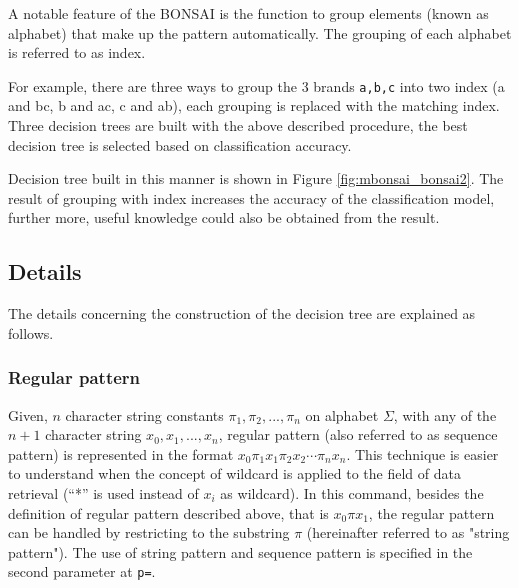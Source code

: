 A notable feature of the BONSAI is the function to group elements (known as alphabet) that make up the pattern automatically. The grouping of each alphabet is referred to as index. 

For example, there are three ways to group the 3 brands \verb|a,b,c| into two index (a and bc, b and ac, c and ab), each grouping is replaced with the matching index.  Three decision trees are built with the above described procedure, the best decision tree is selected based on classification accuracy.

Decision tree built in this manner is shown in Figure \ref{fig:mbonsai_bonsai2}. The result of grouping with index increases the accuracy of the classification model, further more, useful knowledge could also be obtained from the result.



\subsection{Details}
The details concerning the construction of the decision tree are explained as follows. 

\subsubsection{Regular pattern }
Given, $n$ character string constants $\pi_1, \pi_2, ..., \pi_n$ on alphabet $\Sigma$, with any of the $n+1$ character string $x_0, x_1, ..., x_n$, regular pattern (also referred to as sequence pattern)  is represented in the format $x_0\pi_1x_1\pi_2x_2 \cdots \pi_nx_n$. This technique is easier to understand when the concept of  wildcard is applied to the field of data retrieval (``*'' is used instead of $x_i$ as wildcard). In this command, besides the definition of regular pattern described above, that is $x_0\pi x_1$, the regular pattern can be handled by restricting to the substring $\pi$ (hereinafter referred to as "string pattern"). The use of string pattern and sequence pattern is specified in the second parameter at \verb|p=|.


